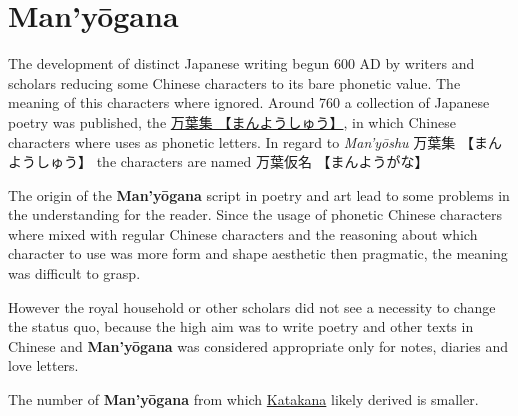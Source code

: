 \section{Man'yōgana}
\label{sec:Manyogana}
\label{sec:Manyoshu}

The development of distinct Japanese writing begun 600 AD by writers and
scholars reducing some Chinese characters to its bare phonetic value. The
meaning of this characters where ignored. Around 760 a collection of Japanese
poetry was published, the \Link
\href{http://en.wikipedia.org/wiki/Man%27y%C5%8Dsh%C5%AB}{万葉集
【まんようしゅう】}, in which Chinese characters where uses as phonetic
letters. In regard to \textit{Man'yōshu} {万葉集} {【まんようしゅう】} the
characters are named {万葉仮名} {【まんようがな】}

The origin of the \textbf{Man'yōgana} script in poetry and art lead to some
problems in the understanding for the reader. Since the usage of phonetic
Chinese characters where mixed with regular Chinese characters and the
reasoning about which character to use was more form and shape aesthetic then
pragmatic, the meaning was difficult to grasp.

However the royal household or other scholars did not see a necessity to change
the status quo, because the high aim was to write poetry and other texts in
Chinese and \textbf{Man'yōgana} was considered appropriate only for notes,
diaries and love letters.


The number of \textbf{Man'yōgana} from which \hyperref[sec:Katakana]{Katakana}
likely derived is smaller.

